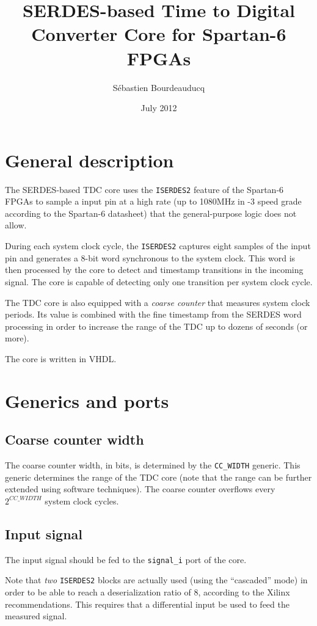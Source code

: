 \documentclass[a4paper,11pt]{article}
\title{SERDES-based Time to Digital Converter Core for Spartan-6 FPGAs}
\author{S\'ebastien Bourdeauducq}
\date{July 2012}
\begin{document}
\setlength{\parindent}{0pt}
\setlength{\parskip}{5pt}
\maketitle{}
\section{General description}
The SERDES-based TDC core uses the \verb!ISERDES2! feature of the Spartan-6 FPGAs to sample a input pin at a high rate (up to 1080MHz in -3 speed grade according to the Spartan-6 datasheet) that the general-purpose logic does not allow.

During each system clock cycle, the \verb!ISERDES2! captures eight samples of the input pin and generates a 8-bit word synchronous to the system clock. This word is then processed by the core to detect and timestamp transitions in the incoming signal. The core is capable of detecting only one transition per system clock cycle.

The TDC core is also equipped with a \textit{coarse counter} that measures system clock periods. Its value is combined with the fine timestamp from the SERDES word processing in order to increase the range of the TDC up to dozens of seconds (or more).

The core is written in VHDL.

\section{Generics and ports}

\subsection{Coarse counter width}
The coarse counter width, in bits, is determined by the \verb!CC_WIDTH! generic. This generic determines the range of the TDC core (note that the range can be further extended using software techniques). The coarse counter overflows every $2^{CC\_WIDTH}$ system clock cycles.

\subsection{Input signal}
The input signal should be fed to the \verb!signal_i! port of the core.

Note that \textit{two} \verb!ISERDES2! blocks are actually used (using the ``cascaded'' mode) in order to be able to reach a deserialization ratio of 8, according to the Xilinx recommendations. This requires that a differential input be used to feed the measured signal.
\end{document}
